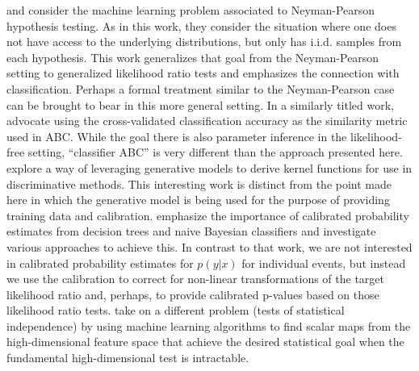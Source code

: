 \documentclass[12pt]{article}
\numberwithin{equation}{section}
\theoremstyle{plain}
\begin{document}
\cite{ClaytonScott} and \cite{JMLR:v14:tong13a} consider the machine learning problem associated to Neyman-Pearson hypothesis testing. As in this work, they consider the situation where one does not have access to the underlying distributions, but only has i.i.d. samples from each hypothesis. This work generalizes that goal from the Neyman-Pearson setting to generalized likelihood ratio tests and emphasizes the connection with classification. Perhaps a  formal treatment similar to the Neyman-Pearson case can be brought to bear in this more general setting.
In a similarly titled work, \cite{Gutmann2014} advocate using the cross-validated classification accuracy as the similarity metric used in ABC. While the goal there is also parameter inference in the likelihood-free setting,  ``classifier ABC'' is very different than the approach presented here.
\cite{TommiJaakkola} explore a way of leveraging generative models to derive kernel functions for use in discriminative methods. This interesting work is distinct from the point made here in which the generative model is being used for the purpose of providing training data and calibration.
\cite{BiancaZadrozny} emphasize the importance of calibrated probability estimates from decision trees and naive Bayesian classifiers and investigate various approaches to achieve this. In contrast to that work, we are not interested in calibrated probability estimates for $p(y|x)$ for individual events, but instead we use the calibration to correct for non-linear transformations of the target likelihood ratio and, perhaps, to provide calibrated p-values based on those likelihood ratio tests. \cite{Ihler2004} take on a different problem (tests of statistical independence) by using machine learning algorithms to find  scalar maps from the high-dimensional feature space that achieve the desired statistical goal when the fundamental high-dimensional test is intractable.
\end{document}
